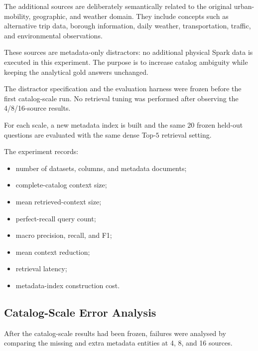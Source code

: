 The additional sources are deliberately semantically related to the original
urban-mobility, geographic, and weather domain. They include concepts such as
alternative trip data, borough information, daily weather, transportation,
traffic, and environmental observations.

These sources are metadata-only distractors: no additional physical Spark data
is executed in this experiment. The purpose is to increase catalog ambiguity
while keeping the analytical gold answers unchanged.

The distractor specification and the evaluation harness were frozen before
the first catalog-scale run. No retrieval tuning was performed after observing
the 4/8/16-source results.

For each scale, a new metadata index is built and the same 20 frozen held-out
questions are evaluated with the same dense Top-\(5\) retrieval setting.

The experiment records:

\begin{itemize}

    \item number of datasets, columns, and metadata documents;

    \item complete-catalog context size;

    \item mean retrieved-context size;

    \item perfect-recall query count;

    \item macro precision, recall, and F1;

    \item mean context reduction;

    \item retrieval latency;

    \item metadata-index construction cost.

\end{itemize}


\subsection{Catalog-Scale Error Analysis}

After the catalog-scale results had been frozen, failures were analysed by
comparing the missing and extra metadata entities at 4, 8, and 16 sources.

